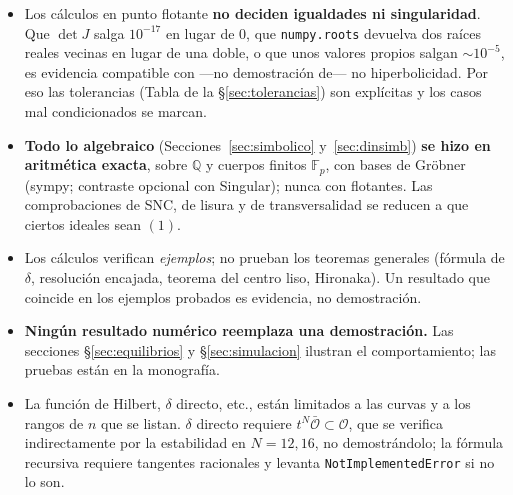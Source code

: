 \documentclass[11pt,a4paper]{article}
\newcommand{\QQ}{\mathbb{Q}}
\newcommand{\FF}{\mathbb{F}}
\newcommand{\cO}{\mathcal{O}}
\theoremstyle{plain}
\theoremstyle{definition}
\theoremstyle{remark}
\begin{document}
\begin{itemize}
\item Los cálculos en punto flotante \textbf{no deciden igualdades ni singularidad}. Que $\det J$ salga $10^{-17}$ en lugar de $0$, que \texttt{numpy.roots} devuelva dos raíces reales vecinas en lugar de una doble, o que unos valores propios salgan $\sim10^{-5}$, es evidencia compatible con ---no demostración de--- no hiperbolicidad. Por eso las tolerancias (Tabla de la \S\ref{sec:tolerancias}) son explícitas y los casos mal condicionados se marcan.
\item \textbf{Todo lo algebraico} (Secciones~\ref{sec:simbolico} y~\ref{sec:dinsimb}) \textbf{se hizo en aritmética exacta}, sobre $\QQ$ y cuerpos finitos $\FF_p$, con bases de Gröbner (sympy; contraste opcional con Singular); nunca con flotantes. Las comprobaciones de SNC, de lisura y de transversalidad se reducen a que ciertos ideales sean $(1)$.
\item Los cálculos verifican \emph{ejemplos}; no prueban los teoremas generales (fórmula de $\delta$, resolución encajada, teorema del centro liso, Hironaka). Un resultado que coincide en los ejemplos probados es evidencia, no demostración.
\item \textbf{Ningún resultado numérico reemplaza una demostración.} Las secciones \S\ref{sec:equilibrios} y \S\ref{sec:simulacion} ilustran el comportamiento; las pruebas están en la monografía.
\item La función de Hilbert, $\delta$ directo, etc., están limitados a las curvas y a los rangos de $n$ que se listan. $\delta$ directo requiere $t^N\bar{\cO}\subset\cO$, que se verifica indirectamente por la estabilidad en $N=12,16$, no demostrándolo; la fórmula recursiva requiere tangentes racionales y levanta \texttt{NotImplementedError} si no lo son.
\end{itemize}
\end{document}
